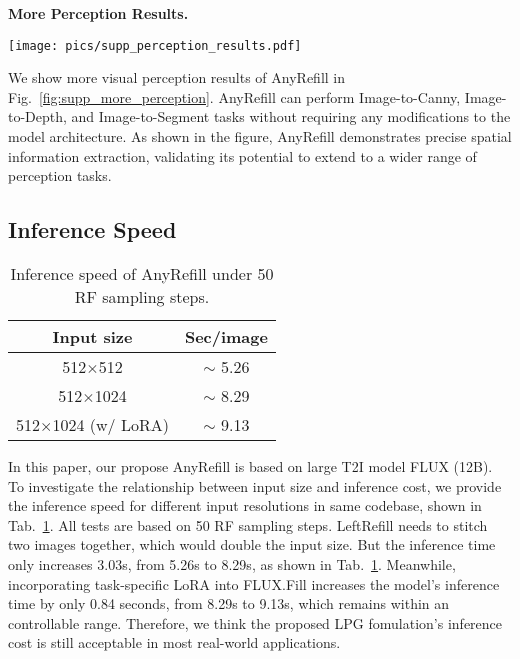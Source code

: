 \noindent\textbf{More Perception Results.}
\begin{figure*}[htb!]
\begin{center}
\texttt{[image: pics/supp\_perception\_results.pdf]}
\end{center}
   \caption{ The illustration of perception tasks, including image-to-canny, image-to depth, and image-to- segment.
   \label{fig:supp_more_perception}}
\vspace{-0.2in}
\end{figure*}
We show more visual perception results of AnyRefill in Fig.~\ref{fig:supp_more_perception}. AnyRefill can perform Image-to-Canny, Image-to-Depth, and Image-to-Segment tasks without requiring any modifications to the model architecture. As shown in the figure, AnyRefill demonstrates precise spatial information extraction, validating its potential to extend to a wider range of perception tasks.

\subsection{Inference Speed}
\begin{table}
\small 
\caption{Inference speed of AnyRefill under 50 RF sampling steps.
\label{tab:infer_speed}}
\vspace{-0.1in}
\centering
\begin{tabular}{cc}
\hline
Input size & Sec/image \tabularnewline
\hline
512$\times$512 & $\sim$ 5.26  \tabularnewline
\hline
512$\times$1024 & $\sim$ 8.29 \tabularnewline
\hline
512$\times$1024 (w/ LoRA) & $\sim$ 9.13 \tabularnewline
\hline
\end{tabular}
\end{table}
In this paper, our propose AnyRefill is based on large T2I model FLUX (12B).
To investigate the relationship between input size and inference cost, we provide the inference speed for different input resolutions in same codebase, shown in Tab.~\ref{tab:infer_speed}. 
All tests are based on 50 RF sampling steps.
LeftRefill needs to stitch two images together, which would double the input size. But the inference time only increases 3.03s, from 5.26s to 8.29s, as shown in Tab.~\ref{tab:infer_speed}. Meanwhile, incorporating task-specific LoRA into FLUX.Fill increases the model’s inference time by only 0.84 seconds, from 8.29s to 9.13s, which remains within an controllable range.
Therefore, we think the proposed LPG fomulation's inference cost is still acceptable in most real-world applications.


